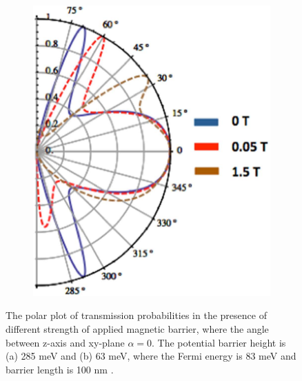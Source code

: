\begin{figure}[H]
\begin{subfigure}[b]{0.4\linewidth}
                \includegraphics[width = \linewidth]{fig/Chap 2/klein b field 2.png}
                \caption{}
                \label{2fig:klein b field 2}
            \end{subfigure}
        \caption{The polar plot of transmission probabilities in the presence of different strength of applied magnetic barrier, 
                    where the angle between z-axis and xy-plane $\alpha = 0$. 
                    The potential barrier height is (a) 285 meV and (b) 63 meV, where the Fermi energy is 83 meV and barrier length is 100 nm \cite{Yesilyurt2016b}.}
        \label{2fig:klein b field}    
    \end{figure}
